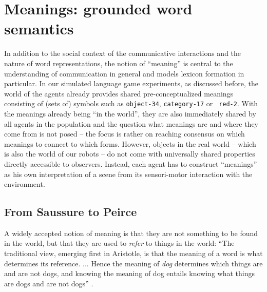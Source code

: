 \section{Meanings: grounded word semantics}
\label{s:meanings}

In addition to the social context of the communicative interactions
and the nature of word representations, the notion of ``meaning'' is
central to the understanding of communication in general and models
lexicon formation in particular. In our simulated language game
experiments, as discussed before, the world of the agents already
provides shared pre-conceptualized meanings consisting of (sets of)
symbols such as {\tt object-34}, {\tt category-17} or {\tt
  red-2}. With the meanings already being ``in the world'', they are
also immediately shared by all agents in the population and the
question what meanings are and where they come from is not posed --
the focus is rather on reaching consensus on which meanings to connect
to which forms. However, objects in the real world -- which is also
the world of our robots -- do not come with universally shared
properties directly accessible to observers. Instead, each agent has
to construct ``meanings'' as his own interpretation of a scene from
its sensori-motor interaction with the environment.



\subsection{From Saussure to Peirce}
\label{s:saussure-to-peirce}


A widely accepted notion of meaning is that they are not something to
be found in the world, but that they are used to \emph{refer} to
things in the world: ``The traditional view, emerging first in
Aristotle, is that the meaning of a word is what determines its
reference. ... Hence the meaning of \emph{dog} determines which things
are and are not dogs, and knowing the meaning of dog entails knowing
what things are dogs and are not dogs''
\citep[p. 18]{bloom00how-children}.

